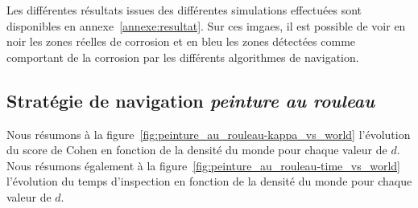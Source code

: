 \documentclass[francais,RandD]{rapportPFE}
\begin{document}

		Les différentes résultats issues des différentes simulations effectuées sont disponibles en annexe~\ref{annexe:resultat}.
		Sur ces imgaes, il est possible de voir en noir les zones réelles de corrosion et en bleu les zones détectées comme comportant de la corrosion par les différents algorithmes de navigation.
		\subsection*{Stratégie de navigation \textit{peinture au rouleau}}
			Nous résumons à la figure~\ref{fig:peinture_au_rouleau-kappa_vs_world} l'évolution du score de Cohen en fonction de la densité du monde pour chaque valeur de $d$.
			Nous résumons également à la figure~\ref{fig:peinture_au_rouleau-time_vs_world} l'évolution du temps d'inspection en fonction de la densité du monde pour chaque valeur de $d$.
\end{document}
